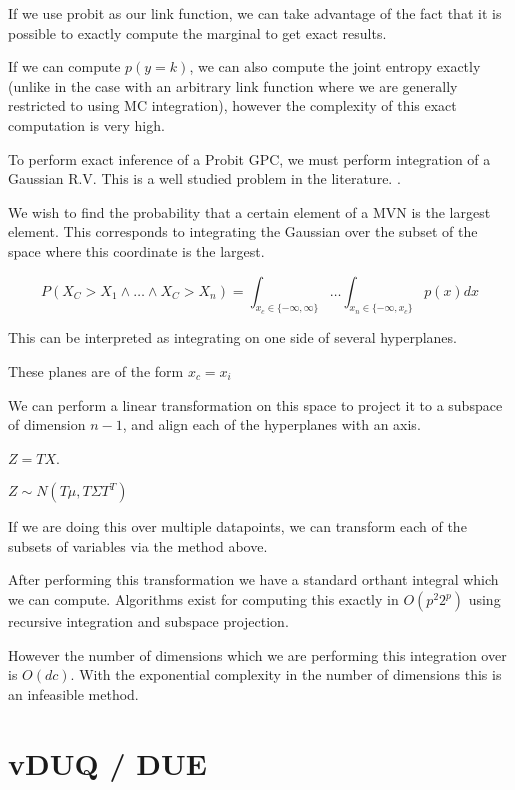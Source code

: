 \documentclass[12pt, a4paper]{report}
\theoremstyle{definition}
\theoremstyle{definition}
\theoremstyle{definition}
\begin{document}
\label{sec:Integration}

If we use probit as our link function, we can take advantage of the fact that it is possible to exactly compute the marginal to get exact results.

If we can compute $p(y=k)$, we can also compute the joint entropy exactly (unlike in the case with an arbitrary link function where we are generally restricted to using MC integration), however the complexity of this exact computation is very high.


To perform exact inference of a Probit GPC, we must perform integration of a Gaussian R.V. This is a well studied problem in the literature. \cite{orthant1}.


We wish to find the probability that a certain element of a MVN is the largest element. This corresponds to integrating the Gaussian over the subset of the space where this coordinate is the largest.

$$P(X_C > X_1 \land \ldots \land X_C > X_n) = \int_{x_c \in \{ -\infty, \infty \} } \ldots \int_{x_n \in \{ -\infty , x_c \}} p(x) dx$$

This can be interpreted as integrating on one side of several hyperplanes.

These planes are of the form $x_c = x_i$

We can perform a linear transformation on this space to project it to a subspace of dimension $n-1$, and align each of the hyperplanes with an axis.

$Z = TX$.

$Z \sim N(T \mu, T \Sigma T^T)$


If we are doing this over multiple datapoints, we can transform each of the subsets of variables via the method above.

After performing this transformation we have a standard orthant integral which we can compute. Algorithms exist for computing this exactly in $O(p^2 2^p)$ using recursive integration and subspace projection. \cite{orthant}


However the number of dimensions which we are performing this integration over is $O(dc)$. With the exponential complexity in the number of dimensions this is an infeasible method.




\chapter{vDUQ / DUE}
\label{sec:DUE}
\end{document}
